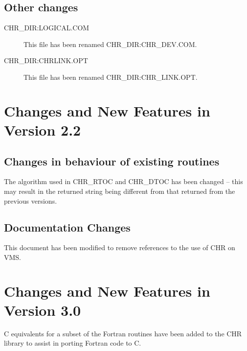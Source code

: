 \documentclass[twoside,11pt,nolof]{starlink}
\begin{document}
\subsection {Other changes}

\begin{description}
\item [CHR\_DIR:LOGICAL.COM] This file has been renamed CHR\_DIR:CHR\_DEV.COM.
\item [CHR\_DIR:CHRLINK.OPT] This file has been renamed CHR\_DIR:CHR\_LINK.OPT.
\end {description}

\section {Changes and New Features in Version 2.2}
\subsection {Changes in behaviour of existing routines}
The algorithm used in CHR\_RTOC and CHR\_DTOC has been changed --
this may result in the returned string being different from that returned
from the previous versions.

\subsection{Documentation Changes}
This document has been modified to remove references to the use of CHR on VMS.

\section {Changes and New Features in Version 3.0}
C equivalents for a subset of the Fortran routines have been added to the
CHR library to assist in porting Fortran code to C.
\end{document}
